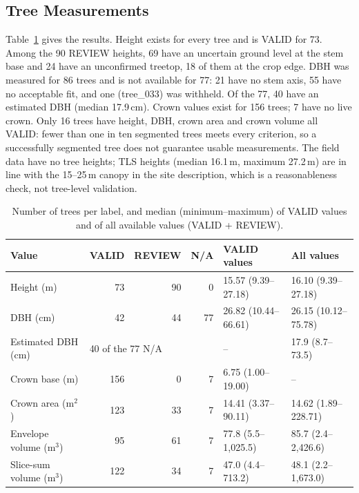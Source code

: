 \documentclass[runningheads]{llncs}
\begin{document}
\subsection{Tree Measurements}\label{sec:res-attr}
Table~\ref{tab:results} gives the results. Height exists for every tree and is VALID for 73. Among the 90 REVIEW heights, 69 have an uncertain ground level at the stem base and 24 have an unconfirmed treetop, 18 of them at the crop edge. DBH was measured for 86 trees and is not available for 77: 21 have no stem axis, 55 have no acceptable fit, and one (tree\_033) was withheld. Of the 77, 40 have an estimated DBH (median 17.9\,cm). Crown values exist for 156 trees; 7 have no live crown. Only 16 trees have height, DBH, crown area and crown volume all VALID: fewer than one in ten segmented trees meets every criterion, so a successfully segmented tree does not guarantee usable measurements. The field data have no tree heights; TLS heights (median 16.1\,m, maximum 27.2\,m) are in line with the 15--25\,m canopy in the site description, which is a reasonableness check, not tree-level validation.
\begin{table}[!tb]
\caption{Number of trees per label, and median (minimum--maximum) of VALID values and of all available values (VALID + REVIEW).}\label{tab:results}
\centering\footnotesize
\setlength{\tabcolsep}{3.5pt}
\begin{tabular}{@{}lrrrll@{}}
\toprule
Value & VALID & REVIEW & N/A & VALID values & All values\\
\midrule
Height (m) & 73 & 90 & 0 & 15.57 (9.39--27.18) & 16.10 (9.39--27.18)\\
DBH (cm) & 42 & 44 & 77 & 26.82 (10.44--66.61) & 26.15 (10.12--75.78)\\
\quad Estimated DBH (cm) & \multicolumn{3}{l}{40 of the 77 N/A} & -- & 17.9 (8.7--73.5)\\
Crown base (m) & 156 & 0 & 7 & 6.75 (1.00--19.00) & --\\
Crown area (m$^2$) & 123 & 33 & 7 & 14.41 (3.37--90.11) & 14.62 (1.89--228.71)\\
Envelope volume (m$^3$) & 95 & 61 & 7 & 77.8 (5.5--1,025.5) & 85.7 (2.4--2,426.6)\\
Slice-sum volume (m$^3$) & 122 & 34 & 7 & 47.0 (4.4--713.2) & 48.1 (2.2--1,673.0)\\
\bottomrule
\end{tabular}
\end{table}
\end{document}
